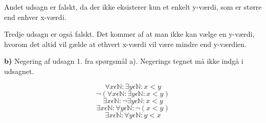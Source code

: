 \documentclass{article}
\begin{document}
Andet udsagn er falskt, da der ikke eksisterer kun et enkelt y-værdi, som er større end enhver x-værdi. 

Tredje udsagn er også falskt. Det kommer af at man ikke kan vælge en y-værdi, hvorom det altid vil gælde at ethvert x-værdi vil være mindre end y-værdien.

\textbf{b)} Negering af udsagn 1. fra spørgsmål a). Negerings tegnet må ikke indgå i udsagnet. 

\begin{displaymath}
\forall x \epsilon \mathbb{N}: \exists y \epsilon \mathbb{N}: x<y
\end{displaymath}
\begin{displaymath}
\neg (\forall x \epsilon \mathbb{N}: \exists y \epsilon \mathbb{N}: x<y)
\end{displaymath}
\begin{displaymath}
\exists x \epsilon \mathbb{N}: \neg \exists y \epsilon \mathbb{N}: x<y
\end{displaymath}
\begin{displaymath}
\exists x \epsilon \mathbb{N}: \forall y \epsilon \mathbb{N}: \neg (x<y)
\end{displaymath}
\begin{displaymath}
\exists x \epsilon \mathbb{N}: \forall y \epsilon \mathbb{N}: y<x
\end{displaymath}
\end{document}
